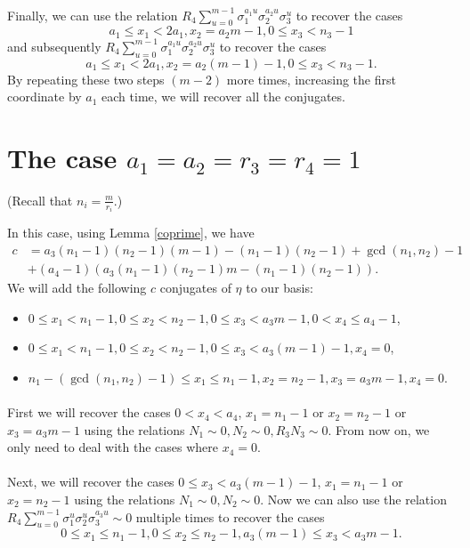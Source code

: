\documentclass[12pt,a4paper]{article}
\begin{document}
\paragraph*{}
Finally, we can use the relation $R_4\sum_{u=0}^{m-1}\sigma_1^{a_1u}\sigma_2^{a_2u}\sigma_3^u$ to recover the cases $$a_1 \leq x_1 <2a_1, x_2 =a_2m-1, 0\leq x_3 <n_3-1$$ and subsequently $R_4\sum_{u=0}^{m-1}\sigma_1^{a_1u}\sigma_2^{a_2u}\sigma_3^u$ to recover the cases $$a_1 \leq x_1 <2a_1, x_2 =a_2(m-1)-1, 0\leq x_3 <n_3-1.$$ By repeating these two steps $(m-2)$ more times, increasing the first coordinate by $a_1$ each time, we will recover all the conjugates.

\section{The case $a_1=a_2=r_3=r_4=1$}
(Recall that $n_i=\frac{m}{r_i}$.)

In this case, using Lemma \ref{coprime}, we have
\begin{equation*}
\begin{split}
c&=a_3\left(n_1-1\right)\left(n_2-1\right)\left(m-1\right)-\left(n_1-1\right)\left(n_2-1\right)+\gcd\left(n_1,n_2\right)-1\\
&+(a_4-1)\left(a_3\left(n_1-1\right)\left(n_2-1\right)m-\left(n_1-1\right)\left(n_2-1\right)\right).
\end{split}
\end{equation*}
We will add the following $c$ conjugates of $\eta$ to our basis:
\begin{itemize}
\item $0\leq x_1<n_1-1, 0\leq x_2<n_2-1, 0\leq x_3<a_3m-1, 0<x_4\leq a_4-1$,
\item $0\leq x_1<n_1-1, 0\leq x_2<n_2-1, 0\leq x_3<a_3(m-1)-1, x_4=0$,
\item $n_1-(\gcd\left(n_1,n_2\right)-1)\leq x_1\leq n_1-1, x_2=n_2-1, x_3=a_3m-1, x_4=0$.
\end{itemize}

\paragraph*{}
First we will recover the cases $0<x_4<a_4$, $x_1=n_1-1$ or $x_2=n_2-1$ or $x_3=a_3m-1$ using the relations $N_1\sim 0, N_2\sim 0, R_3N_3\sim 0$. From now on, we only need to deal with the cases where $x_4=0$.
\paragraph*{}
Next, we will recover the cases $0\leq x_3<a_3(m-1)-1$, $x_1=n_1-1$ or $x_2=n_2-1$ using the relations $N_1\sim 0, N_2\sim 0$. Now we can also use the relation $R_4\sum_{u=0}^{m-1}\sigma_1^{u}\sigma_2^{u}\sigma_3^{a_3u}\sim 0$ multiple times to recover the cases $$0\leq x_1\leq n_1-1, 0\leq x_2\leq n_2-1, a_3(m-1)\leq x_3<a_3m-1.$$
\end{document}
